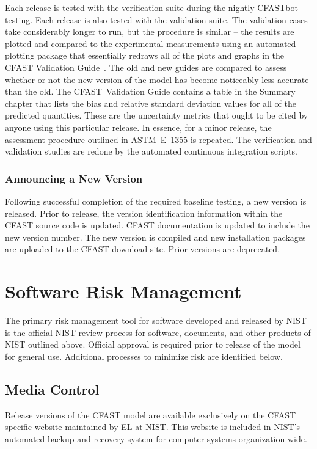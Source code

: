 \documentclass[12pt]{book}
\begin{document}
Each release is tested with the verification suite during the nightly CFASTbot testing. Each release is also tested with the validation suite. The validation cases take considerably longer to run, but the procedure is similar -- the results are plotted and compared to the experimental measurements using an automated plotting package that essentially redraws all of the plots and graphs in the CFAST Validation Guide~\cite{CFAST_Valid_Guide_7}. The old and new guides are compared to assess whether or not the new version of the model has become noticeably less accurate than the old. The CFAST~Validation Guide contains a table in the Summary chapter that lists the bias and relative standard deviation values for all of the predicted quantities. These are the uncertainty metrics that ought to be cited by anyone using this particular  release. In essence, for a minor release, the assessment procedure outlined in ASTM~E~1355 is repeated. The verification and validation studies are redone by the automated continuous integration scripts.


\subsection{Announcing a New Version}

Following successful completion of the required baseline testing, a new version is released.  Prior to release, the version identification information within the CFAST source code is updated.  CFAST documentation is updated to include the new version number.  The new version is compiled and new installation packages are uploaded to the CFAST download site.  Prior versions are deprecated.


\chapter{Software Risk Management}

The primary risk management tool for software developed and released by NIST is the official NIST review process for software, documents, and other products of NIST outlined above. Official approval is required prior to release of the model for general use. Additional processes to minimize risk are identified below.

\section{Media Control}

Release versions of the CFAST model are available exclusively on the CFAST specific website maintained by EL at NIST. This website is included in NIST's automated backup and recovery system for computer systems organization wide.
\end{document}
